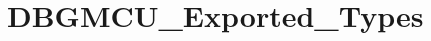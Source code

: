 \hypertarget{group___d_b_g_m_c_u___exported___types}{}\section{D\+B\+G\+M\+C\+U\+\_\+\+Exported\+\_\+\+Types}
\label{group___d_b_g_m_c_u___exported___types}
